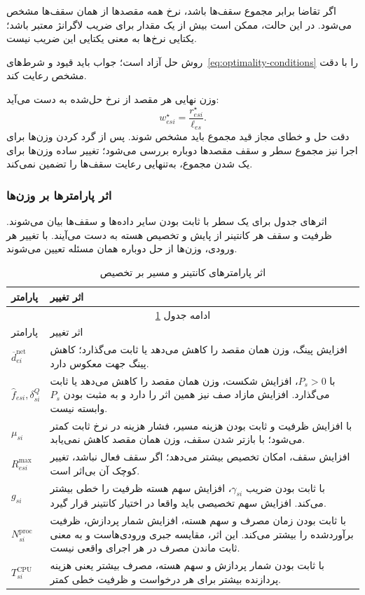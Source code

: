 اگر تقاضا برابر مجموع سقف‌ها باشد، نرخ همه مقصدها از همان سقف‌ها مشخص می‌شود. در این حالت، ممکن است بیش از یک مقدار برای ضریب لاگرانژ معتبر باشد؛ یکتایی نرخ‌ها به معنی یکتایی این ضریب نیست.

روش حل آزاد است؛ جواب باید قیود و شرط‌های~\eqref{eq:optimality-conditions} را با دقت مشخص رعایت کند.

وزن نهایی هر مقصد از نرخ حل‌شده به دست می‌آید:
\begin{equation}
 w_{esi}^{\star}=\frac{r_{esi}^{\star}}{\ell_{es}}.
 \label{eq:final-weights}
\end{equation}
دقت حل و خطای مجاز قید مجموع باید مشخص شوند. پس از گرد کردن وزن‌ها برای اجرا نیز مجموع سطر و سقف مقصدها دوباره بررسی می‌شود؛ تغییر ساده وزن‌ها برای یک شدن مجموع، به‌تنهایی رعایت سقف‌ها را تضمین نمی‌کند.


\subsubsection{اثر پارامترها بر وزن‌ها}
\label{sec:parameter-effects}

اثرهای جدول برای یک سطر با ثابت بودن سایر داده‌ها و سقف‌ها بیان می‌شوند. ظرفیت و سقف هر کانتینر از پایش و تخصیص هسته به دست می‌آیند. با تغییر هر ورودی، وزن‌ها از حل دوباره همان مسئله تعیین می‌شوند.

\begin{longtable}{p{3.2cm}p{10.8cm}}
\caption{اثر پارامترهای کانتینر و مسیر بر تخصیص}\label{tab:local-effects}\\
\toprule پارامتر & اثر تغییر \\
\midrule\endfirsthead
\multicolumn{2}{c}{ادامه جدول \ref{tab:local-effects}}\\
\toprule پارامتر & اثر تغییر \\
\midrule\endhead\bottomrule\endfoot
$\overline d^{\mathrm{net}}_{ei}$ & افزایش پینگ، وزن همان مقصد را کاهش می‌دهد یا ثابت می‌گذارد؛ کاهش پینگ جهت معکوس دارد. \\
$\widehat f_{esi},\delta^Q_{si}$ & با $P_s>0$، افزایش شکست، وزن همان مقصد را کاهش می‌دهد یا ثابت می‌گذارد. افزایش مازاد صف نیز همین اثر را دارد و به مثبت بودن $P_s$ وابسته نیست. \\
$\mu_{si}$ & با افزایش ظرفیت و ثابت بودن هزینه مسیر، فشار هزینه در نرخ ثابت کمتر می‌شود؛ با بازتر شدن سقف، وزن همان مقصد کاهش نمی‌یابد. \\
$R^{\mathrm{max}}_{esi}$ & افزایش سقف، امکان تخصیص بیشتر می‌دهد؛ اگر سقف فعال نباشد، تغییر کوچک آن بی‌اثر است. \\
$g_{si}$ & با ثابت بودن ضریب $\gamma_{si}$، افزایش سهم هسته ظرفیت را خطی بیشتر می‌کند. افزایش سهم تخصیصی باید واقعا در اختیار کانتینر قرار گیرد. \\
$N^{\mathrm{proc}}_{si}$ & با ثابت بودن زمان مصرف و سهم هسته، افزایش شمار پردازش، ظرفیت برآوردشده را بیشتر می‌کند. این اثر، مقایسه جبری ورودی‌هاست و به معنی ثابت ماندن مصرف در هر اجرای واقعی نیست. \\
$T^{\mathrm{CPU}}_{si}$ & با ثابت بودن شمار پردازش و سهم هسته، مصرف بیشتر یعنی هزینه پردازنده بیشتر برای هر درخواست و ظرفیت خطی کمتر. \\
\end{longtable}

